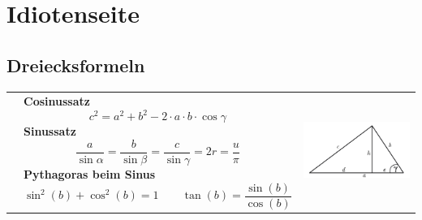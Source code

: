 \section{Idiotenseite}
\subsection{Dreiecksformeln}
\begin{tabular}{lll}
	& \parbox{9.5cm}{
		\textbf{Cosinussatz} \\
		$$c^2 = a^2 + b^2 - 2 \cdot a \cdot b \cdot \cos \gamma$$\\
		\textbf{Sinussatz} \\
		$$\frac{a}{\sin \alpha} = \frac{b}{\sin \beta} = \frac{c}{\sin \gamma} = 2r =
		\frac{u}{\pi}$$
		\textbf{Pythagoras beim Sinus}\\
		$$\sin^2(b)+\cos^2(b)=1 \qquad \tan(b)=\frac{\sin(b)}{\cos(b)}$$}
	& \parbox{8cm}{
		\includegraphics[width=6cm]{./bilder/cosinussatz.png}}
\end{tabular}



	
